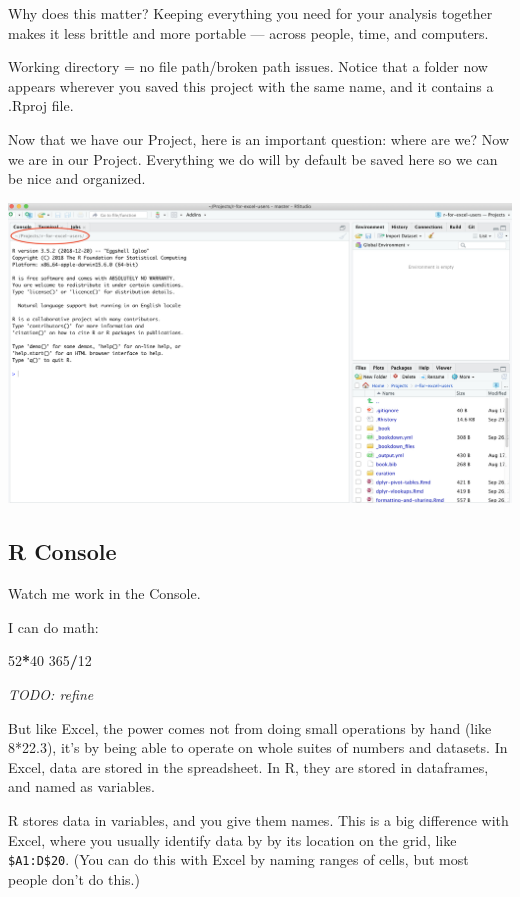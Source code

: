 \documentclass[]{book}
\newenvironment{Shaded}{\begin{snugshade}}{\end{snugshade}}
\newcommand{\DecValTok}[1]{\textcolor[rgb]{0.00,0.00,0.81}{#1}}
\newcommand{\OperatorTok}[1]{\textcolor[rgb]{0.81,0.36,0.00}{\textbf{#1}}}
\begin{document}
Why does this matter? Keeping everything you need for your analysis together makes it less brittle and more portable --- across people, time, and computers.

Working directory = no file path/broken path issues. Notice that a folder now appears wherever you saved this project with the same name, and it contains a .Rproj file.

Now that we have our Project, here is an important question: where are we? Now we are in our Project. Everything we do will by default be saved here so we can be nice and organized.

\includegraphics[width=0.8\linewidth]{img/RStudio_IDE_projdir}

\hypertarget{r-console}{%
\subsection{R Console}\label{r-console}}

Watch me work in the Console.

I can do math:

\begin{Shaded}
\begin{Highlighting}[]
\DecValTok{52}\OperatorTok{*}\DecValTok{40}
\DecValTok{365}\OperatorTok{/}\DecValTok{12}
\end{Highlighting}
\end{Shaded}

\emph{TODO: refine}

But like Excel, the power comes not from doing small operations by hand (like 8*22.3), it's by being able to operate on whole suites of numbers and datasets. In Excel, data are stored in the spreadsheet. In R, they are stored in dataframes, and named as variables.

R stores data in variables, and you give them names. This is a big difference with Excel, where you usually identify data by by its location on the grid, like \texttt{\$A1:D\$20}. (You can do this with Excel by naming ranges of cells, but most people don't do this.)
\end{document}
